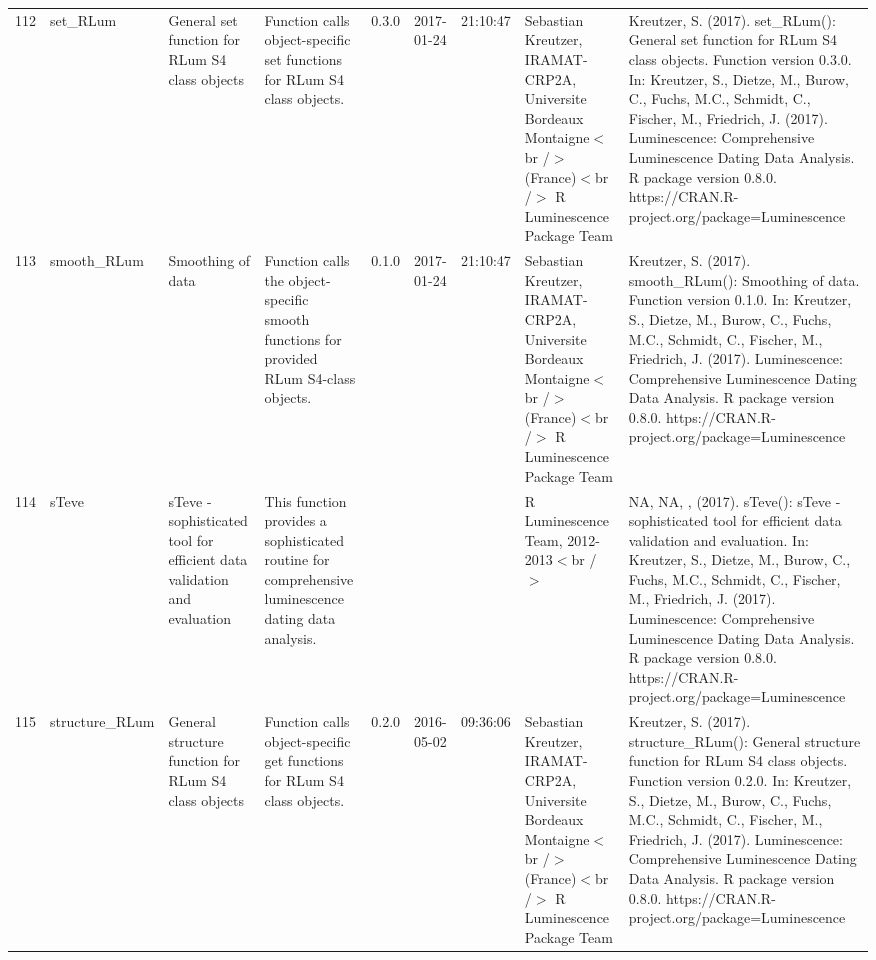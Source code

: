 \begin{table}[ht]
\begin{tabular}{rllllllll}
 \\ 
  112 & set\_RLum & General set function for RLum S4 class objects & Function calls object-specific set functions for RLum S4 class objects. & 0.3.0 & 2017-01-24 & 21:10:47
 & Sebastian Kreutzer, IRAMAT-CRP2A, Universite Bordeaux Montaigne$<$br /$>$ (France)$<$br /$>$  R Luminescence Package Team & Kreutzer, S. (2017). set\_RLum(): General set function for RLum S4 class objects. Function version 0.3.0. In: Kreutzer, S., Dietze, M., Burow, C., Fuchs, M.C., Schmidt, C., Fischer, M., Friedrich, J. (2017). Luminescence: Comprehensive Luminescence Dating Data Analysis. R package version 0.8.0. https://CRAN.R-project.org/package=Luminescence
 \\ 
  113 & smooth\_RLum & Smoothing of data & Function calls the object-specific smooth functions for provided RLum S4-class objects. & 0.1.0 & 2017-01-24 & 21:10:47
 & Sebastian Kreutzer, IRAMAT-CRP2A, Universite Bordeaux Montaigne$<$br /$>$ (France)$<$br /$>$  R Luminescence Package Team & Kreutzer, S. (2017). smooth\_RLum(): Smoothing of data. Function version 0.1.0. In: Kreutzer, S., Dietze, M., Burow, C., Fuchs, M.C., Schmidt, C., Fischer, M., Friedrich, J. (2017). Luminescence: Comprehensive Luminescence Dating Data Analysis. R package version 0.8.0. https://CRAN.R-project.org/package=Luminescence
 \\ 
  114 & sTeve & sTeve - sophisticated tool for efficient data validation and evaluation & This function provides a sophisticated routine for comprehensive luminescence dating data analysis. &  &  &  & R Luminescence Team, 2012-2013$<$br /$>$ & NA, NA, ,  (2017). sTeve(): sTeve - sophisticated tool for efficient data validation and evaluation. In: Kreutzer, S., Dietze, M., Burow, C., Fuchs, M.C., Schmidt, C., Fischer, M., Friedrich, J. (2017). Luminescence: Comprehensive Luminescence Dating Data Analysis. R package version 0.8.0. https://CRAN.R-project.org/package=Luminescence
 \\ 
  115 & structure\_RLum & General structure function for RLum S4 class objects & Function calls object-specific get functions for RLum S4 class objects. & 0.2.0 & 2016-05-02 & 09:36:06
 & Sebastian Kreutzer, IRAMAT-CRP2A, Universite Bordeaux Montaigne$<$br /$>$ (France)$<$br /$>$  R Luminescence Package Team & Kreutzer, S. (2017). structure\_RLum(): General structure function for RLum S4 class objects. Function version 0.2.0. In: Kreutzer, S., Dietze, M., Burow, C., Fuchs, M.C., Schmidt, C., Fischer, M., Friedrich, J. (2017). Luminescence: Comprehensive Luminescence Dating Data Analysis. R package version 0.8.0. https://CRAN.R-project.org/package=Luminescence

\end{tabular}
\end{table}
